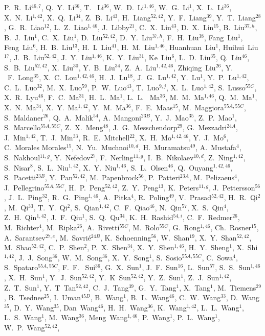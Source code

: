 \begin{small}
\begin{center}
P.~R.~Li$^{46,7}$, Q.~Y.~Li$^{36}$, T. ~Li$^{36}$, W.~D.~Li$^{1,46}$, W.~G.~Li$^{1}$, X.~L.~Li$^{36}$, X.~N.~Li$^{1,42}$, X.~Q.~Li$^{34}$, Z.~B.~Li$^{43}$, H.~Liang$^{52,42}$, Y.~F.~Liang$^{39}$, Y.~T.~Liang$^{28}$, G.~R.~Liao$^{12}$, L.~Z.~Liao$^{1,46}$, J.~Libby$^{21}$, C.~X.~Lin$^{43}$, D.~X.~Lin$^{15}$, B.~Liu$^{37,h}$, B.~J.~Liu$^{1}$, C.~X.~Liu$^{1}$, D.~Liu$^{52,42}$, D.~Y.~Liu$^{37,h}$, F.~H.~Liu$^{38}$, Fang~Liu$^{1}$, Feng~Liu$^{6}$, H.~B.~Liu$^{13}$, H.~L~Liu$^{41}$, H.~M.~Liu$^{1,46}$, Huanhuan~Liu$^{1}$, Huihui~Liu$^{17}$, J.~B.~Liu$^{52,42}$, J.~Y.~Liu$^{1,46}$, K.~Y.~Liu$^{31}$, Ke~Liu$^{6}$, L.~D.~Liu$^{35}$, Q.~Liu$^{46}$, S.~B.~Liu$^{52,42}$, X.~Liu$^{30}$, Y.~B.~Liu$^{34}$, Z.~A.~Liu$^{1,42,46}$, Zhiqing~Liu$^{26}$, Y. ~F.~Long$^{35}$, X.~C.~Lou$^{1,42,46}$, H.~J.~Lu$^{18}$, J.~G.~Lu$^{1,42}$, Y.~Lu$^{1}$, Y.~P.~Lu$^{1,42}$, C.~L.~Luo$^{32}$, M.~X.~Luo$^{59}$, P.~W.~Luo$^{43}$, T.~Luo$^{9,j}$, X.~L.~Luo$^{1,42}$, S.~Lusso$^{55C}$, X.~R.~Lyu$^{46}$, F.~C.~Ma$^{31}$, H.~L.~Ma$^{1}$, L.~L. ~Ma$^{36}$, M.~M.~Ma$^{1,46}$, Q.~M.~Ma$^{1}$, X.~N.~Ma$^{34}$, X.~Y.~Ma$^{1,42}$, Y.~M.~Ma$^{36}$, F.~E.~Maas$^{15}$, M.~Maggiora$^{55A,55C}$, S.~Maldaner$^{26}$, Q.~A.~Malik$^{54}$, A.~Mangoni$^{23B}$, Y.~J.~Mao$^{35}$, Z.~P.~Mao$^{1}$, S.~Marcello$^{55A,55C}$, Z.~X.~Meng$^{48}$, J.~G.~Messchendorp$^{29}$, G.~Mezzadri$^{24A}$, J.~Min$^{1,42}$, T.~J.~Min$^{33}$, R.~E.~Mitchell$^{22}$, X.~H.~Mo$^{1,42,46}$, Y.~J.~Mo$^{6}$, C.~Morales Morales$^{15}$, N.~Yu.~Muchnoi$^{10,d}$, H.~Muramatsu$^{49}$, A.~Mustafa$^{4}$, S.~Nakhoul$^{11,g}$, Y.~Nefedov$^{27}$, F.~Nerling$^{11,g}$, I.~B.~Nikolaev$^{10,d}$, Z.~Ning$^{1,42}$, S.~Nisar$^{8}$, S.~L.~Niu$^{1,42}$, X.~Y.~Niu$^{1,46}$, S.~L.~Olsen$^{46}$, Q.~Ouyang$^{1,42,46}$, S.~Pacetti$^{23B}$, Y.~Pan$^{52,42}$, M.~Papenbrock$^{56}$, P.~Patteri$^{23A}$, M.~Pelizaeus$^{4}$, J.~Pellegrino$^{55A,55C}$, H.~P.~Peng$^{52,42}$, Z.~Y.~Peng$^{13}$, K.~Peters$^{11,g}$, J.~Pettersson$^{56}$, J.~L.~Ping$^{32}$, R.~G.~Ping$^{1,46}$, A.~Pitka$^{4}$, R.~Poling$^{49}$, V.~Prasad$^{52,42}$, H.~R.~Qi$^{2}$, M.~Qi$^{33}$, T.~Y.~Qi$^{2}$, S.~Qian$^{1,42}$, C.~F.~Qiao$^{46}$, N.~Qin$^{57}$, X.~S.~Qin$^{4}$, Z.~H.~Qin$^{1,42}$, J.~F.~Qiu$^{1}$, S.~Q.~Qu$^{34}$, K.~H.~Rashid$^{54,i}$, C.~F.~Redmer$^{26}$, M.~Richter$^{4}$, M.~Ripka$^{26}$, A.~Rivetti$^{55C}$, M.~Rolo$^{55C}$, G.~Rong$^{1,46}$, Ch.~Rosner$^{15}$, A.~Sarantsev$^{27,e}$, M.~Savri\'e$^{24B}$, K.~Schoenning$^{56}$, W.~Shan$^{19}$, X.~Y.~Shan$^{52,42}$, M.~Shao$^{52,42}$, C.~P.~Shen$^{2}$, P.~X.~Shen$^{34}$, X.~Y.~Shen$^{1,46}$, H.~Y.~Sheng$^{1}$, X.~Shi$^{1,42}$, J.~J.~Song$^{36}$, W.~M.~Song$^{36}$, X.~Y.~Song$^{1}$, S.~Sosio$^{55A,55C}$, C.~Sowa$^{4}$, S.~Spataro$^{55A,55C}$, F.~F. ~Sui$^{36}$, G.~X.~Sun$^{1}$, J.~F.~Sun$^{16}$, L.~Sun$^{57}$, S.~S.~Sun$^{1,46}$, X.~H.~Sun$^{1}$, Y.~J.~Sun$^{52,42}$, Y.~K~Sun$^{52,42}$, Y.~Z.~Sun$^{1}$, Z.~J.~Sun$^{1,42}$, Z.~T.~Sun$^{1}$, Y.~T~Tan$^{52,42}$, C.~J.~Tang$^{39}$, G.~Y.~Tang$^{1}$, X.~Tang$^{1}$, M.~Tiemens$^{29}$, B.~Tsednee$^{25}$, I.~Uman$^{45D}$, B.~Wang$^{1}$, B.~L.~Wang$^{46}$, C.~W.~Wang$^{33}$, D.~Wang$^{35}$, D.~Y.~Wang$^{35}$, Dan~Wang$^{46}$, H.~H.~Wang$^{36}$, K.~Wang$^{1,42}$, L.~L.~Wang$^{1}$, L.~S.~Wang$^{1}$, M.~Wang$^{36}$, Meng~Wang$^{1,46}$, P.~Wang$^{1}$, P.~L.~Wang$^{1}$, W.~P.~Wang$^{52,42}$, 
\end{center}
\end{small}
